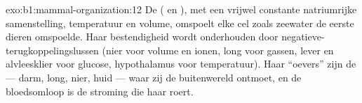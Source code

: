 \begin{solution}{exo:b1:mammal-organization:12}
De  ( en ), met een
vrijwel constante natriumrijke samenstelling, temperatuur en volume, omspoelt
elke cel zoals zeewater de eerste dieren omspoelde. Haar bestendigheid wordt
onderhouden door negatieve-terugkoppelingslussen (nier voor volume en ionen,
long voor gassen, lever en alvleesklier voor glucose, hypothalamus voor
temperatuur). Haar ``oevers'' zijn de  --- darm, long,
nier, huid --- waar zij de buitenwereld ontmoet, en de bloedsomloop is de
stroming die haar roert.
\end{solution}

